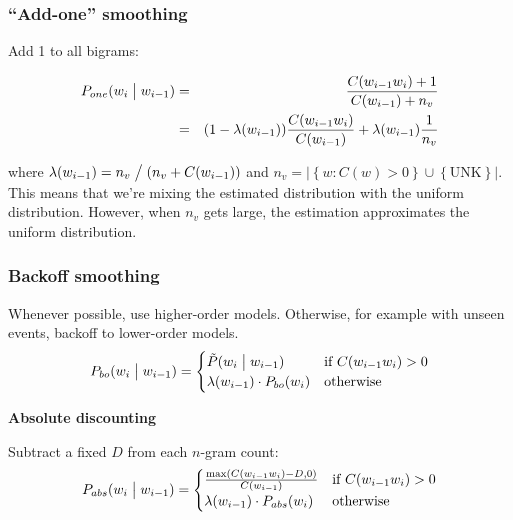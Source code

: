 \subsubsection{``Add-one'' smoothing}

Add 1 to all bigrams:

\begin{eqnarray*}
    P_{one}(w_i \bigm| w_{i - 1}) &=& \frac{C(w_{i-1}w_i)+1}{C(w_{i-1}) + n_v} \\
                                  &=& (1 - \lambda(w_{i-1})) \frac{C(w_{i-1}w_i)}{C(w_{i-1})} + \lambda(w_{i-1}) \frac{1}{n_v}
\end{eqnarray*}

where $\lambda(w_{i-1}) = n_v \bigm/ (n_v + C(w_{i-1}))$ and $n_v = \left|\left\{w : C(w) > 0 \right\} \cup \left\{\mbox{UNK} \right\}\right|$. This means that we're mixing the estimated distribution with the uniform distribution. However, when $n_v$ gets large, the estimation approximates the uniform distribution.

\subsubsection{Backoff smoothing}

Whenever possible, use higher-order models. Otherwise, for example with unseen events, backoff to lower-order models.
\begin{equation*}
    P_{bo}(w_i \bigm| w_{i-1}) = \begin{cases}
        \tilde{P}(w_i \bigm| w_{i-1}) & \mbox{if } C(w_{i-1}w_i) > 0 \\
        \lambda(w_{i-1}) \cdot P_{bo}(w_i) & \mbox{otherwise}
                                 \end{cases}
\end{equation*}

\vspace{20pt}
\textbf{Absolute discounting}
\vspace{10pt}

Subtract a fixed $D$ from each $n$-gram count:
\begin{equation*}
    P_{abs}(w_i \bigm| w_{i-1}) = \begin{cases}
        \frac{\max(C(w_{i-1}w_i)-D, 0)}{C(w_{i-1})} & \mbox{if } C(w_{i-1}w_i) > 0 \\
        \lambda(w_{i-1}) \cdot P_{abs}(w_i) & \mbox{otherwise}
                                 \end{cases}
\end{equation*}

